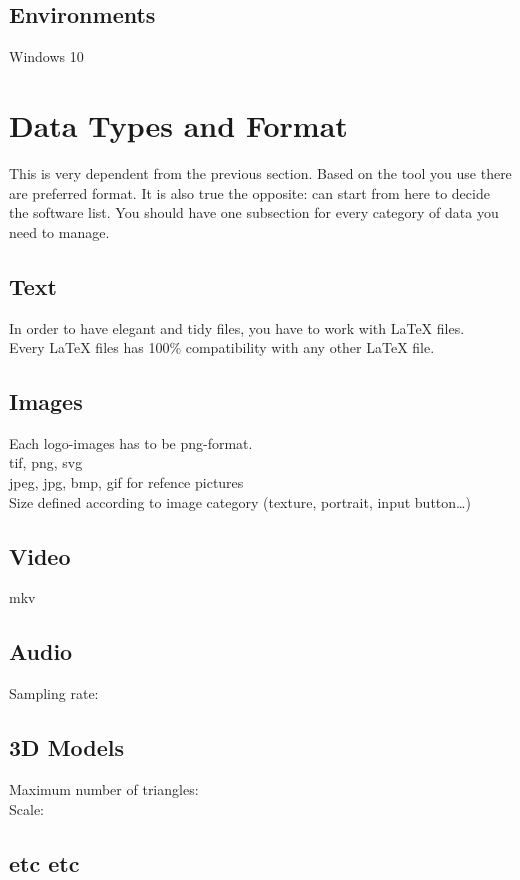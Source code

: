 \documentclass[12pt]{article}
\begin{document}
\subsection{Environments}
Windows 10

\section{Data Types and Format}
This is very dependent from the previous section. Based on the tool you use there are preferred format. It is also true the opposite: can start from here to decide the software list.
You should have one subsection for every category of data you need to manage. 

\subsection{Text}
In order to have elegant and tidy files, you have to work with LaTeX files. \\
Every LaTeX files has 100\% compatibility with any other LaTeX file.

\subsection{Images}
Each logo-images has to be png-format. \\
tif, png, svg \\
jpeg, jpg, bmp, gif for refence pictures \\
Size defined according to image category (texture, portrait, input button…)

\subsection{Video}
mkv

\subsection{Audio}
Sampling rate:

\subsection{3D Models}
Maximum number of triangles: \\
Scale: 

\subsection{etc etc}
\end{document}
